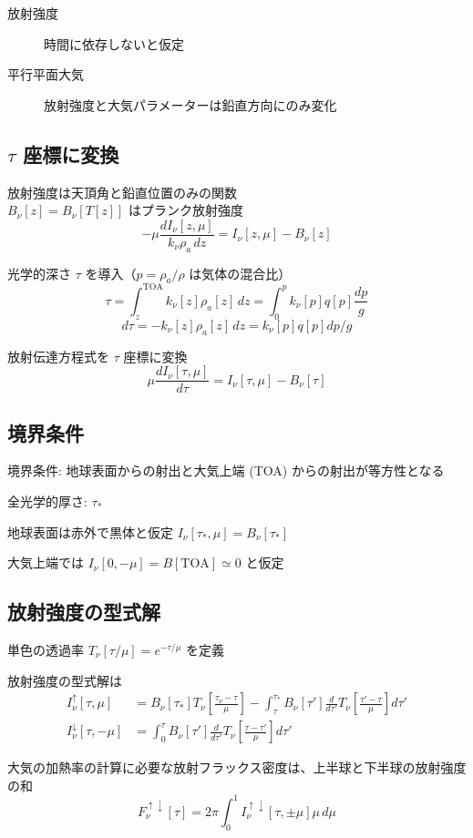 \documentclass[article]{dennou777}
\begin{document}
\begin{description}
	\item[放射強度] 時間に依存しないと仮定
	\item[平行平面大気] 放射強度と大気パラメーターは鉛直方向にのみ変化
\end{description}

\subsection{$\tau$ 座標に変換}
放射強度は天頂角と鉛直位置のみの関数\\
$B_\nu[z]=B_\nu[T[z]]$ はプランク放射強度
\[-\mu\frac{dI_\nu[z,\mu]}{k_\nu\rho_a\,dz}=I_\nu[z,\mu]-B_\nu[z]\]

光学的深さ $\tau$ を導入（$p=\rho_a/\rho$ は気体の混合比）
\[\tau=\int^{\mathrm{TOA}}_{z} k_\nu[z]\rho_a[z]\,dz=\int^p_0 k_\nu[p]q[p]\frac{dp}{g}\]
\[d\tau=-k_\nu[z]\rho_a[z]\,dz=k_\nu[p]q[p]dp/g\]

放射伝達方程式を $\tau$ 座標に変換
\[\mu\frac{dI_\nu[\tau,\mu]}{d\tau}=I_\nu[\tau,\mu]-B_\nu[\tau]\]

\subsection{境界条件}
境界条件: 地球表面からの射出と大気上端 (TOA) からの射出が等方性となる

全光学的厚さ: $\tau_*$

地球表面は赤外で黒体と仮定 $I_\nu[\tau_*,\mu]=B_\nu[\tau_*]$

大気上端では $I_\nu[0,-\mu]=B[\mathrm{TOA}]\simeq0$ と仮定

\subsection{放射強度の型式解}
単色の透過率 $T_\nu[\tau/\mu]=e^{-\tau/\mu}$ を定義

放射強度の型式解は
\begin{align*}
	I^\uparrow_\nu[\tau,\mu]
		&=B_\nu[\tau_*]T_\nu\left[\frac{\tau_\nu-\tau}{\mu}\right]
		-\int^{\tau_*}_\tau B_\nu[\tau']\frac{d}{d\tau'}T_\nu\left[\frac{\tau'-\tau}{\mu}\right]d\tau'\\
	I^\downarrow_\nu[\tau,-\mu]
		&=\int^\tau_0 B_\nu[\tau']\frac{d}{d\tau'}T_\nu\left[\frac{\tau-\tau'}{\mu}\right]d\tau'
\end{align*}

大気の加熱率の計算に必要な放射フラックス密度は、上半球と下半球の放射強度の和
\[F^{\uparrow\downarrow}_\nu[\tau]=2\pi\int^1_0 I^{\uparrow\downarrow}_\nu[\tau,\pm\mu]\mu\,d\mu\]
\end{document}
